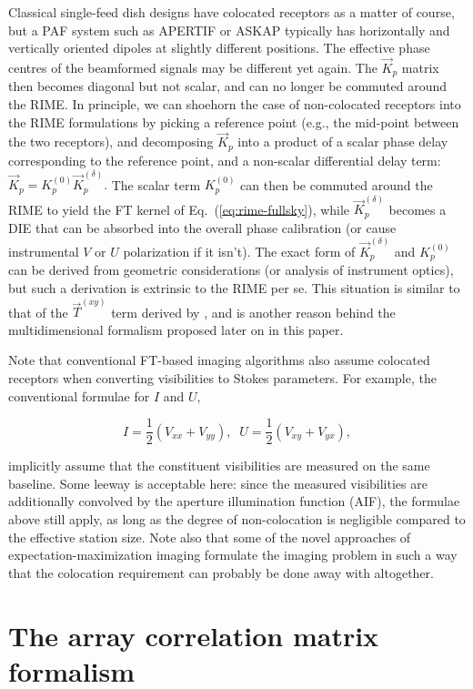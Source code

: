 \documentclass[]{aa}
\newcommand{\jones}[2]{\vec {#1}_{#2}}
\begin{document}
Classical single-feed dish designs have colocated receptors as a matter of course, but a PAF system such as APERTIF \citep{Apertif} or ASKAP \citep{ASKAP} typically has horizontally and vertically oriented dipoles at slightly different positions. The effective phase centres of the beamformed signals may be different yet again. The $\jones{K}{p}$ matrix then becomes diagonal but not scalar, and can no longer be commuted around the RIME. In principle, we can shoehorn the case of non-colocated receptors into the RIME formulations by picking a reference point (e.g., the  mid-point between the two receptors), and decomposing $\jones{K}{p}$ into a product of a scalar phase delay corresponding to the reference point, and a non-scalar differential delay term: $\jones{K}{p}=K_p^{(0)}\jones{K}{p}^{(\delta)}.$ The scalar term $K_p^{(0)}$ can then be commuted around the RIME to yield the FT kernel of Eq.~(\ref{eq:rime-fullsky}), while $\jones{K}{p}^{(\delta)}$ becomes a DIE that can be absorbed into the overall phase calibration (or cause instrumental $V$ or $U$ polarization if it isn't). The exact form of $\jones{K}{p}^{(\delta)}$ and $K_p^{(0)}$ can be derived from geometric considerations (or analysis of instrument optics), but such a derivation is extrinsic to the RIME per se. This situation is similar to that of the $\jones{T}{}^{(xy)}$ term derived by \citet{Carozzi:ME3D}, and is another reason behind the multidimensional formalism proposed later on in this paper.

Note that conventional FT-based imaging algorithms also assume colocated receptors when converting visibilities to Stokes parameters. For example, the conventional formulae for $I$ and $U$,

\[
I=\frac{1}{2}(V_{xx}+V_{yy}),\;\;U=\frac{1}{2}(V_{xy}+V_{yx}),
\] 

implicitly assume that the constituent visibilities are measured on the same baseline. Some leeway is acceptable here: since the measured visibilities are additionally convolved by the aperture illumination function (AIF), the formulae above still apply, as long as the degree of non-colocation is negligible compared to the effective station size. Note also that some of the novel approaches of expectation-maximization imaging \citep{leshem-em,levanda-leshem-em} formulate the imaging problem in such a way that the colocation requirement can probably be done away with altogether.


\section{The array correlation matrix formalism}
\label{sec:matrix}
\end{document}

